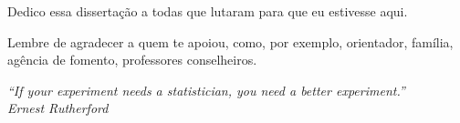 \begin{dedicatoria}
    \vspace*{\fill}
    \hfill
    \begin{minipage}{.6\textwidth}
     Dedico essa dissertação a todas que lutaram para que eu estivesse aqui. 
    \end{minipage}
\end{dedicatoria}
 
\begin{agradecimentos}
    Lembre de agradecer a quem te apoiou, como, por exemplo, orientador,
    família, agência de fomento, professores conselheiros. 
\end{agradecimentos}

\begin{epigrafe}
\vspace*{\fill}

\begin{flushright}
    \hspace{7.5cm}
    \textit{
        ``If your experiment needs a statistician, you need a better
        experiment.''} \\
        \textit{Ernest Rutherford}
\end{flushright}
\end{epigrafe}